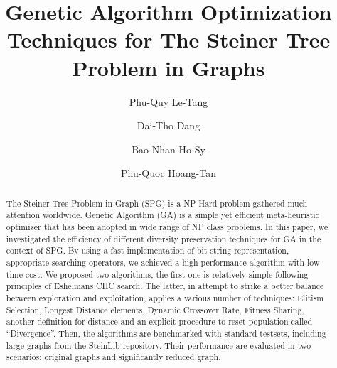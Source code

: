 \documentclass[runningheads]{llncs}
\begin{document}
%
\title{Genetic Algorithm Optimization Techniques for The Steiner Tree Problem in Graphs}
%
%

\author{Phu-Quy Le-Tang \and
Dai-Tho Dang \and
Bao-Nhan Ho-Sy \and
Phu-Quoc Hoang-Tan
}
%
%
%
\maketitle              %
%
\begin{abstract}
    The Steiner Tree Problem in Graph (SPG) is a NP-Hard problem gathered much attention worldwide. 
    Genetic Algorithm (GA) is a simple yet efficient meta-heuristic optimizer that has been adopted in wide range of NP class problems. 
    In this paper, we investigated the efficiency of different diversity preservation techniques for GA in the context of SPG. 
    By using a fast implementation of bit string representation, appropriate searching operators, 
    we achieved a high-performance algorithm with low time cost. 
    We proposed two algorithms, the first one is relatively simple following principles of Eshelman\textquotesingle s CHC search.
    The latter, in attempt to strike a better balance between exploration and exploitation, applies a various number of techniques: Elitism Selection, Longest Distance elements, Dynamic Crossover Rate, Fitness Sharing, another definition for distance and an explicit procedure to reset population called ``Divergence''.
    Then, the algorithms are benchmarked with standard testsets, including large graphs from the SteinLib repository. Their performance are evaluated in two scenarios: original graphs and significantly reduced graph. 

\end{abstract}
%
%
%
\end{document}
